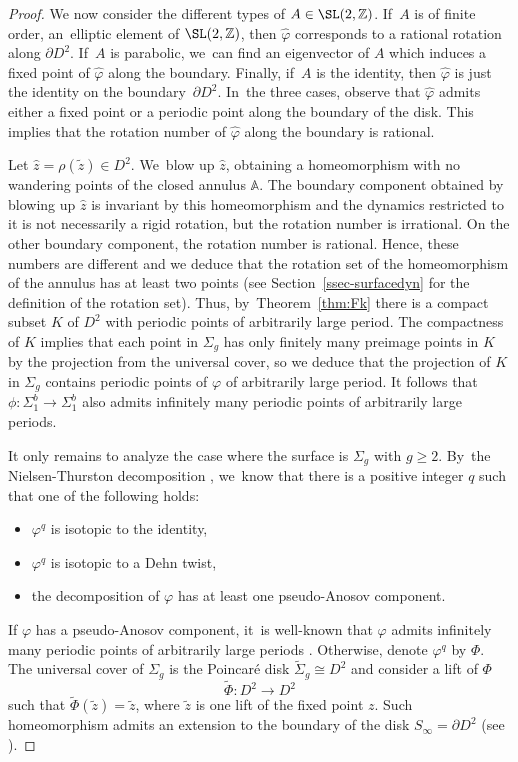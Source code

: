 \begin{proof}
We now consider the different types of $A\in \SL(2,\mathbb{Z})$. If~$A$ is of finite order, \ie an~elliptic element of $\SL(2,\mathbb{Z})$, then $\widehat \varphi$ corresponds to a rational rotation along $\partial D^2$. If~$A$ is parabolic, we~can find an eigenvector of $A$ which induces a fixed point of $\widehat \varphi$ along the boundary. Finally, if~$A$ is the identity, then $\widehat \varphi$ is just the identity on the boundary~$\partial D^2$. In~the three cases, observe that $\widehat \varphi$ admits either a fixed point or a periodic point along the boundary of the disk. This implies that the rotation number of $\widehat \varphi$ along the boundary is rational.

Let $\hat z=\rho(\widetilde z)\in D^2$. We~blow up $\hat z$, obtaining a homeomorphism with no wandering points of the closed annulus $\mathbb{A}$. The boundary component obtained by blowing up $\hat z$ is invariant by this homeomorphism and the dynamics restricted to it is not necessarily a rigid rotation, but the rotation number is irrational. On the other boundary component, the rotation number is rational. Hence, these numbers are different and we deduce that the rotation set of the homeomorphism of the annulus has at least two points (see Section~\ref{ssec-surfacedyn} for the definition of the rotation set). Thus, by~Theorem~\ref{thm:Fk} there is a compact subset $K$ of $D^2$ with periodic points of arbitrarily large period. The compactness of $K$ implies that each point in $\Sigma_g$ has only finitely many preimage points in $K$ by the projection from the universal cover, so we deduce that the projection of $K$ in $\Sigma_g$ contains periodic points of $\varphi$ of arbitrarily large period. It follows that $\phi:\Sigma_1^b \to \Sigma_1^b$ also admits infinitely many periodic points of arbitrarily large periods.

It only remains to analyze the case where the surface is $\Sigma_g$ with $g \geq 2$. By~the Nielsen-Thurston decomposition \cite{T, FLP}, we~know that there is a positive integer $q$ such that one of the following holds:
\begin{itemize}
\item
$\varphi^q$ is isotopic to the identity,
\item
$\varphi^q$ is isotopic to a Dehn twist,
\item
the decomposition of $\varphi$ has at least one pseudo-Anosov component.
\end{itemize}
If $\varphi$ has a pseudo-Anosov component, it~is well-known that $\varphi$ admits infinitely many periodic points of arbitrarily large periods \cite{Ha}. Otherwise, denote $\varphi^q$ by $\Phi$. The universal cover of $\Sigma_g$ is the Poincaré disk $\widetilde \Sigma_g \cong D^2$ and consider a lift of $\Phi$
\[
\widetilde \Phi: D^2 \to D^2
\]
such that $\widetilde \Phi(\widetilde z)=\widetilde z$, where $\widetilde z$ is one lift of the fixed point $z$. Such homeomorphism admits an extension to the boundary of the disk $S_\infty=\partial D^2$ (see \eg \cite[Cor.\,1.2]{T}).


\end{proof}

